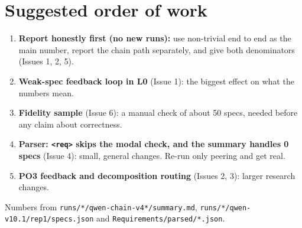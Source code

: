 \documentclass[10pt,a4paper]{article}
\newcommand{\code}[1]{\texttt{\small #1}}
\begin{document}
\section{Suggested order of work}
\begin{enumerate}
\item \textbf{Report honestly first (no new runs):} use non-trivial end to end as the main number, report the chain path
      separately, and give both denominators (Issues 1, 2, 5).
\item \textbf{Weak-spec feedback loop in L0} (Issue 1): the biggest effect on what the numbers mean.
\item \textbf{Fidelity sample} (Issue 6): a manual check of about 50 specs, needed before any claim about correctness.
\item \textbf{Parser: \code{<req>} skips the modal check, and the summary handles 0 specs} (Issue 4): small, general changes.
      Re-run only peering and get real.
\item \textbf{PO3 feedback and decomposition routing} (Issues 2, 3): larger research changes.
\end{enumerate}

\vfill
{\footnotesize Numbers from \code{runs/*/qwen-chain-v4*/summary.md}, \code{runs/*/qwen-v10.1/rep1/specs.json} and
\code{Requirements/parsed/*.json}.}
\end{document}
